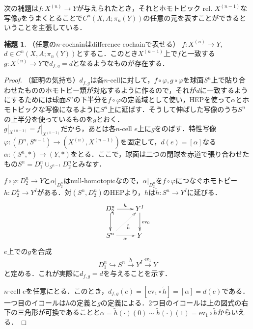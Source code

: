 \documentclass[a4paper,11pt]{jsarticle}
\theoremstyle{definition}
\newtheorem{lem}[thm]{補題}
\begin{document}
次の補題は$f\colon X^{(n)}\to Y$が与えられたとき，それとホモトピック rel. $X^{(n-1)}$な写像$g$をうまくとることで$C^n(X,A;\pi_n(Y))$の任意の元を表すことができるということを主張している．

\label{representN-CochainAsDiffCochain}
\begin{lem}（任意の$n$-cochainはdifference cochainで表せる） $f\colon X^{(n)}\to Y$, $d\in C^n(X,A;\pi_n(Y))$とするこ．このとき$X^{(n-1)}$上で$f$と一致する$g\colon X^{(n)}\to Y$で$d_{f,g}=d$となるようなものが存在する．
\end{lem}
\begin{proof}
  （証明の気持ち）$d_{f,g}$は各$n$-cellに対して，$f\circ\varphi,g\circ\varphi$を球面$S^n$上で貼り合わせたもののホモトピー類が対応するように作るので，それが$d$に一致するようにするためには球面$S^n$の下半分を$f\circ\varphi$の定義域として使い，HEPを使って$\alpha$とホモトピックな写像になるように$S^n$上に延ばす．そうして伸ばした写像のうち$S^n$の上半分を使っているものを$g$とおく．\\


  $g|_{X^{(n-1)}}=f|_{X^{(n-1)}}$だから，あとは各$n$-cell $e$上に$g$をのばす．特性写像$\varphi\colon(D^n,S^{n-1})\to (X^{(n)},X^{(n-1)})$を固定して，$d(e)=[\alpha]$なる$\alpha\colon (S^n,*)\to (Y,*)$をとる．ここで，球面は二つの閉球を赤道で張り合わせたもの$S^n=D^n_1\cup_{S^{n-1}}D^n_2$とみなす．

  $f\circ \varphi\colon D^n_2\to Y$と$\alpha|_{D^n_2}$はnull-homotopicなので，$\alpha|_{D^n_2}$を$f\circ \varphi$につなぐホモトピー$h\colon D^n_2\to Y^I$がある．対$(S^n,D^n_2)$のHEPより，$h$は$\tilde{h}\colon S^n\to Y^I$に延びる．\[
  \xymatrix{
    D^n_2 \ar[r]^h \ar@{^{(}->}[d]
    & Y^I \ar[d]^{\mathrm{ev}_0}\\
    S^n \ar[r]_{\alpha} \ar@{.>}[ru]_{\tilde{h}}
    & Y
  }
  \]
  $e$上での$g$を合成\[
    D^n_1\hookrightarrow S^n\xrightarrow{\tilde{h}}Y^I\xrightarrow{\mathrm{ev}_1}Y  
  \]と定める．これが実際に$d_{f,g}=d$を与えることを示す．

  $n$-cell $e$を任意にとる．このとき，$d_{f,g}(e)=[\mathrm{ev}_1\circ\tilde{h}]=[\alpha]=d(e)$である．一つ目のイコールは$h$の定義と$g$の定義による．2つ目のイコールは上の図式の右下の三角形が可換であることと$\alpha=\tilde{h}(\cdot)(0)\sim\tilde{h}(\cdot)(1)=\mathrm{ev}_1\circ \tilde{h}$からいえる．
\end{proof}
\end{document}
